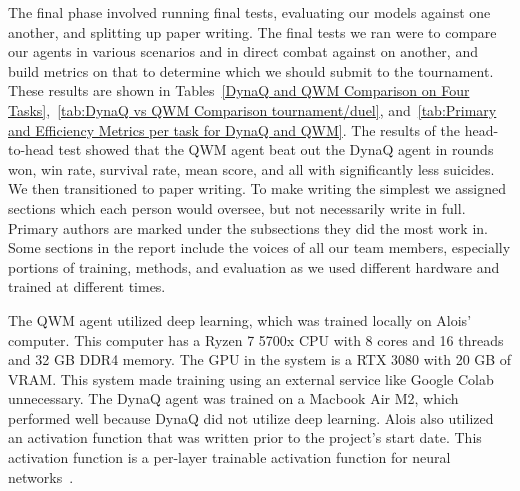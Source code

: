 \documentclass[article, 10pt]{IEEEtran}
\begin{document}
The final phase involved running final tests, evaluating our models against one another, and splitting up paper writing. The final tests we ran were to compare our agents in various scenarios and in direct combat against on another, and build metrics on that to determine which we should submit to the tournament. These results are shown in Tables~\ref{DynaQ and QWM Comparison on Four Tasks},~\ref{tab:DynaQ vs QWM Comparison tournament/duel}, and~\ref{tab:Primary and Efficiency Metrics per task for DynaQ and QWM}. The results of the head-to-head test showed that the QWM agent beat out the DynaQ agent in rounds won, win rate, survival rate, mean score, and all with significantly less suicides. We then transitioned to paper writing. To make writing the simplest we assigned sections which each person would oversee, but not necessarily write in full. Primary authors are marked under the subsections they did the most work in. Some sections in the report include the voices of all our team members, especially portions of training, methods, and evaluation as we used different hardware and trained at different times.

The QWM agent utilized deep learning, which was trained locally on Alois' computer. This computer has a Ryzen 7 5700x CPU with 8 cores and 16 threads and 32 GB DDR4 memory. The GPU in the system is a RTX 3080 with 20 GB of VRAM. This system made training using an external service like Google Colab unnecessary. The DynaQ agent was trained on a Macbook Air M2, which performed well because DynaQ did not utilize deep learning. Alois also utilized an activation function that was written prior to the project's start date. This activation function is a per-layer trainable activation function for neural networks~\cite{bachmann2026dynactivationtrainableactivationfamily}.




\end{document}
